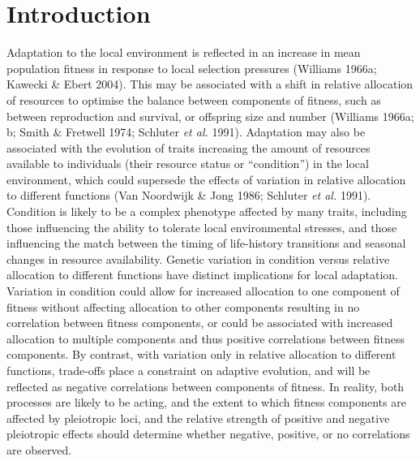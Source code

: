 \documentclass[
]{article}
\begin{document}
\hypertarget{introduction}{%
\section{Introduction}\label{introduction}}

Adaptation to the local environment is reflected in an increase in mean population fitness in response to local selection pressures (Williams 1966a; Kawecki \& Ebert 2004). This may be associated with a shift in relative allocation of resources to optimise the balance between components of fitness, such as between reproduction and survival, or offspring size and number (Williams 1966a; b; Smith \& Fretwell 1974; Schluter \emph{et al.} 1991). Adaptation may also be associated with the evolution of traits increasing the amount of resources available to individuals (their resource status or ``condition'') in the local environment, which could supersede the effects of variation in relative allocation to different functions (Van Noordwijk \& Jong 1986; Schluter \emph{et al.} 1991). Condition is likely to be a complex phenotype affected by many traits, including those influencing the ability to tolerate local environmental stresses, and those influencing the match between the timing of life-history transitions and seasonal changes in resource availability. Genetic variation in condition versus relative allocation to different functions have distinct implications for local adaptation. Variation in condition could allow for increased allocation to one component of fitness without affecting allocation to other components resulting in no correlation between fitness components, or could be associated with increased allocation to multiple components and thus positive correlations between fitness components. By contrast, with variation only in relative allocation to different functions, trade-offs place a constraint on adaptive evolution, and will be reflected as negative correlations between components of fitness. In reality, both processes are likely to be acting, and the extent to which fitness components are affected by pleiotropic loci, and the relative strength of positive and negative pleiotropic effects should determine whether negative, positive, or no correlations are observed.
\end{document}
